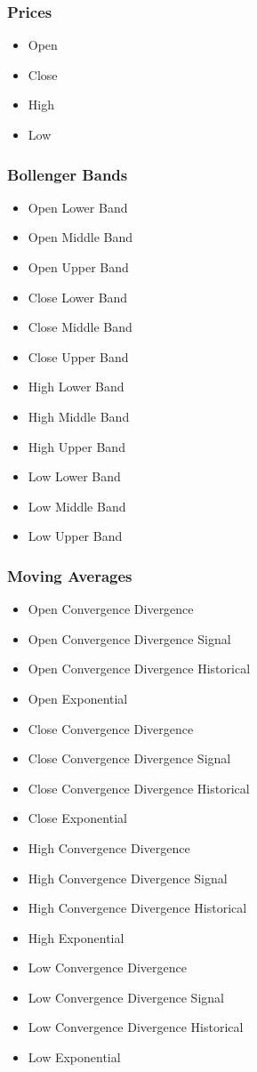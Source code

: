 \documentclass[journal]{IEEEtran}
\begin{document}
\subsubsection{Prices}

\begin{itemize}
	\item Open
	\item Close
	\item High
	\item Low
\end{itemize}

\subsubsection{Bollenger Bands}

\begin{itemize}
	\item Open Lower Band
	\item Open Middle Band
	\item Open Upper Band
	\item Close Lower Band
	\item Close Middle Band
	\item Close Upper Band
	\item High Lower Band
	\item High Middle Band
	\item High Upper Band
	\item Low Lower Band
	\item Low Middle Band
	\item Low Upper Band
\end{itemize}

\subsubsection{Moving Averages}

\begin{itemize}
	\item Open Convergence Divergence
	\item Open Convergence Divergence Signal
	\item Open Convergence Divergence Historical
	\item Open Exponential
	\item Close Convergence Divergence
	\item Close Convergence Divergence Signal
	\item Close Convergence Divergence Historical
	\item Close Exponential
	\item High Convergence Divergence 
	\item High Convergence Divergence Signal
	\item High Convergence Divergence Historical
	\item High Exponential
	\item Low Convergence Divergence
	\item Low Convergence Divergence Signal
	\item Low Convergence Divergence Historical
	\item Low Exponential
\end{itemize}
\end{document}
